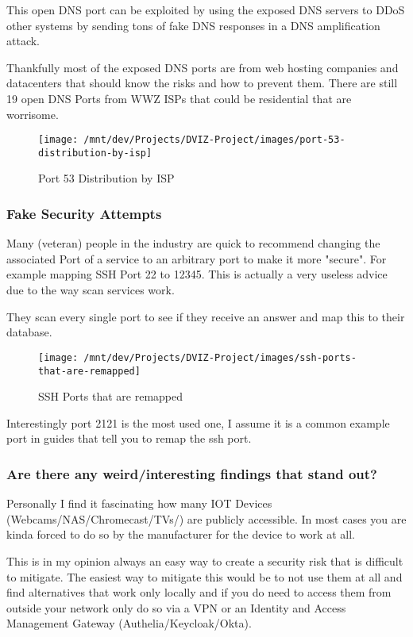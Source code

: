 \documentclass[11pt,a4paper]{article}
\begin{document}
\begin{data}
This open DNS port can be exploited by using the exposed DNS servers to DDoS other systems by sending tons of fake DNS responses in a DNS amplification attack.

Thankfully most of the exposed DNS ports are from web hosting companies and datacenters that should know the risks and how to prevent them.
There are still 19 open DNS Ports from WWZ ISPs that could be residential that are worrisome.

\begin{figure}[!h]
    \centering
    \texttt{[image: /mnt/dev/Projects/DVIZ-Project/images/port-53-distribution-by-isp]}
    \caption{Port 53 Distribution by ISP}
    \label{fig:port-53-distribution-by-isp}
\end{figure}

\newpage
\subsubsection{Fake Security Attempts}
Many (veteran) people in the industry are quick to recommend changing the associated Port of a service to an arbitrary port
to make it more "secure". For example mapping SSH Port 22 to 12345. This is actually a very useless advice due to the way scan services work.

They scan every single port to see if they receive an answer and map this to their database.

\begin{figure}[!h]
    \centering
    \texttt{[image: /mnt/dev/Projects/DVIZ-Project/images/ssh-ports-that-are-remapped]}
    \caption{SSH Ports that are remapped}
    \label{fig:ssh-ports-that-are-remapped}
\end{figure}

Interestingly port 2121 is the most used one, I assume it is a common example port in guides that tell you to remap the ssh port.

\subsubsection{Are there any weird/interesting findings that stand out?}
Personally I find it fascinating how many IOT Devices (Webcams/NAS/Chromecast/TVs/) are publicly accessible. In most cases you
are kinda forced to do so by the manufacturer for the device to work at all.

This is in my opinion always an easy way to create a security risk that is difficult to mitigate. The easiest way to mitigate this
would be to not use them at all and find alternatives that work only locally and if you do need to access them from outside your
network only do so via a VPN or an Identity and Access Management Gateway (Authelia/Keycloak/Okta).
\end{data}
\newpage
\end{document}
